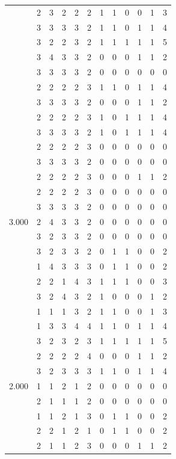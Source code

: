 \documentclass[]{book}
\theoremstyle{definition}
\theoremstyle{definition}
\theoremstyle{definition}
\theoremstyle{remark}
\begin{document}
\begin{table}
{\begin{tabular}[t]{rrrrrrrrrrrr}
 & 2 & 3 & 2 & 2 & 2 & 1 & 1 & 0 & 0 & 1 & 3\\
 & 3 & 3 & 3 & 3 & 2 & 1 & 1 & 0 & 1 & 1 & 4\\
 & 3 & 2 & 2 & 3 & 2 & 1 & 1 & 1 & 1 & 1 & 5\\
 & 3 & 4 & 3 & 3 & 2 & 0 & 0 & 0 & 1 & 1 & 2\\
 & 3 & 3 & 3 & 3 & 2 & 0 & 0 & 0 & 0 & 0 & 0\\
 & 2 & 2 & 2 & 2 & 3 & 1 & 1 & 0 & 1 & 1 & 4\\
 & 3 & 3 & 3 & 3 & 2 & 0 & 0 & 0 & 1 & 1 & 2\\
 & 2 & 2 & 2 & 2 & 3 & 1 & 0 & 1 & 1 & 1 & 4\\
 & 3 & 3 & 3 & 3 & 2 & 1 & 0 & 1 & 1 & 1 & 4\\
 & 2 & 2 & 2 & 2 & 3 & 0 & 0 & 0 & 0 & 0 & 0\\
 & 3 & 3 & 3 & 3 & 2 & 0 & 0 & 0 & 0 & 0 & 0\\
 & 2 & 2 & 2 & 2 & 3 & 0 & 0 & 0 & 1 & 1 & 2\\
 & 2 & 2 & 2 & 2 & 3 & 0 & 0 & 0 & 0 & 0 & 0\\
 & 3 & 3 & 3 & 3 & 2 & 0 & 0 & 0 & 0 & 0 & 0\\
3.000 & 2 & 4 & 3 & 3 & 2 & 0 & 0 & 0 & 0 & 0 & 0\\
 & 3 & 2 & 3 & 3 & 2 & 0 & 0 & 0 & 0 & 0 & 0\\
 & 3 & 2 & 3 & 3 & 2 & 0 & 1 & 1 & 0 & 0 & 2\\
 & 1 & 4 & 3 & 3 & 3 & 0 & 1 & 1 & 0 & 0 & 2\\
 & 2 & 2 & 1 & 4 & 3 & 1 & 1 & 1 & 0 & 0 & 3\\
 & 3 & 2 & 4 & 3 & 2 & 1 & 0 & 0 & 0 & 1 & 2\\
 & 1 & 1 & 1 & 3 & 2 & 1 & 1 & 0 & 0 & 1 & 3\\
 & 1 & 3 & 3 & 4 & 4 & 1 & 1 & 0 & 1 & 1 & 4\\
 & 3 & 2 & 3 & 2 & 3 & 1 & 1 & 1 & 1 & 1 & 5\\
 & 2 & 2 & 2 & 2 & 4 & 0 & 0 & 0 & 1 & 1 & 2\\
 & 3 & 2 & 3 & 3 & 3 & 1 & 1 & 0 & 1 & 1 & 4\\
2.000 & 1 & 1 & 2 & 1 & 2 & 0 & 0 & 0 & 0 & 0 & 0\\
 & 2 & 1 & 1 & 1 & 2 & 0 & 0 & 0 & 0 & 0 & 0\\
 & 1 & 1 & 2 & 1 & 3 & 0 & 1 & 1 & 0 & 0 & 2\\
 & 2 & 2 & 1 & 2 & 1 & 0 & 1 & 1 & 0 & 0 & 2\\
 & 2 & 1 & 1 & 2 & 3 & 0 & 0 & 0 & 1 & 1 & 2\\

\end{tabular}}
\end{table}
\end{document}
